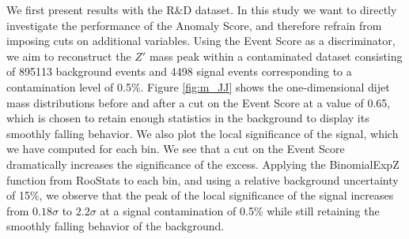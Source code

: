 \documentclass[letterpaper,11pt]{article}
\begin{document}

We first present results with the R\&D dataset. In this study we want to directly investigate the performance of the Anomaly Score, and therefore refrain from imposing cuts on additional variables. Using the Event Score as a discriminator, we aim to reconstruct the $Z'$ mass peak within a contaminated dataset consisting of 895113 background events and 4498 signal events corresponding to a contamination level of 0.5\%. Figure \ref{fig:m_JJ} shows the one-dimensional dijet mass distributions before and after a cut on the Event Score at a value of 0.65, which is chosen to retain enough statistics in the background to display its smoothly falling behavior. We also plot the local significance of the signal, which we have computed for each bin. We see that a cut on the Event Score dramatically increases the significance of the excess. Applying the {\sc BinomialExpZ} function from {\sc RooStats} to each bin, and using a relative background uncertainty of 15\%, we observe that the peak of the local significance of the signal increases from $0.18\sigma$ to $2.2\sigma$ at a signal contamination of 0.5\% while still retaining the smoothly falling behavior of the background.
\end{document}
